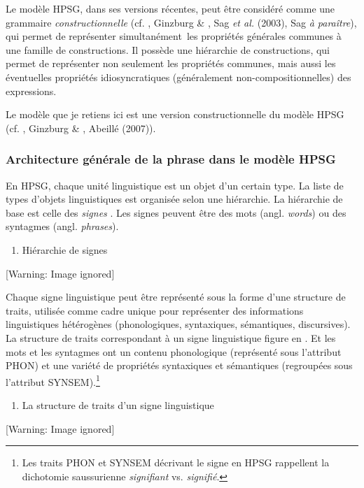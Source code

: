 Le modèle HPSG, dans ses versions récentes, peut être considéré comme une grammaire \textit{constructionnelle} (cf. \citet{Sag1997}, Ginzburg \& \citet{Sag2000}, Sag \textit{et al.} (2003), Sag \textit{à paraître}), qui permet de représenter simultanément~les propriétés générales communes à une famille de constructions. Il possède une hiérarchie de constructions, qui permet de représenter non seulement les propriétés communes, mais aussi les éventuelles propriétés idiosyncratiques (généralement non-compositionnelles) des expressions. 

Le modèle que je retiens ici est une version constructionnelle du modèle HPSG (cf. \citet{Sag1997}, Ginzburg \& \citet{Sag2000}, Abeillé (2007)).

\subsubsection{Architecture générale de la phrase dans le modèle HPSG}
En HPSG, chaque unité linguistique est un objet d'un certain type. La liste de types d'objets linguistiques est organisée selon une hiérarchie. La hiérarchie de base est celle des \textit{signes} . Les signes peuvent être des mots (angl. \textit{words}) ou des syntagmes (angl. \textit{phrases}).


\begin{enumerate}
\item \label{bkm:Ref299358974}Hiérarchie de signes


\end{enumerate}
{   [Warning: Image ignored] %
} 

Chaque signe linguistique peut être représenté sous la forme d'une structure de traits, utilisée comme cadre unique pour représenter des informations linguistiques hétérogènes (phonologiques, syntaxiques, sémantiques, discursives). La structure de traits correspondant à un signe linguistique figure en . Et les mots et les syntagmes ont un contenu phonologique (représenté sous l'attribut PHON) et une variété de propriétés syntaxiques et sémantiques (regroupées sous l'attribut SYNSEM).\footnote{Les traits PHON et SYNSEM décrivant le signe en HPSG rappellent la dichotomie saussurienne \textit{signifiant} vs. \textit{signifié}.} 


\begin{enumerate}
\item \label{bkm:Ref299359517}La structure de traits d'un signe linguistique  


\end{enumerate}
  [Warning: Image ignored] %
 

